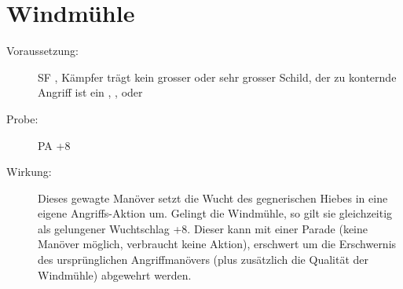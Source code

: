 \section{Windmühle}
\label{bPA.windmuehle}
\begin{description}
    \item[Voraussetzung:]
        SF , Kämpfer trägt kein grosser oder sehr grosser Schild, der zu konternde Angriff ist ein , ,  oder 
    \item[Probe:]
        PA +8
    \item[Wirkung:]
        Dieses gewagte Manöver setzt die Wucht des gegnerischen Hiebes in eine eigene Angriffs-Aktion um.
        Gelingt die Windmühle, so gilt sie gleichzeitig als gelungener Wuchtschlag +8.
        Dieser kann mit einer Parade (keine Manöver möglich, verbraucht keine Aktion), erschwert um die Erschwernis des ursprünglichen Angriffmanövers (plus zusätzlich die Qualität der Windmühle) abgewehrt werden.
\end{description}
